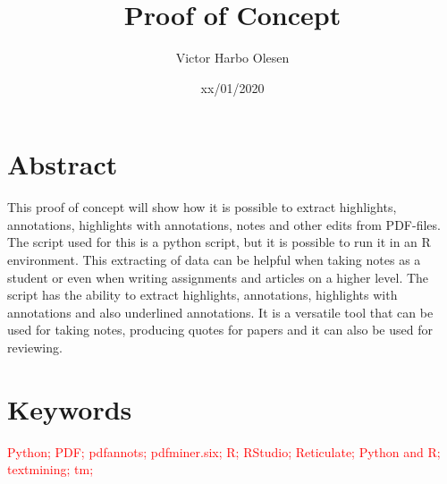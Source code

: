 \documentclass{article}
\title{Proof of Concept}
\author{Victor Harbo Olesen}
\date{xx/01/2020}
\begin{document}
\maketitle

\section{Abstract}
This proof of concept will show how it is possible to extract highlights, annotations, highlights with annotations, notes and other edits from PDF-files. The script used for this is a python script, but it is possible to run it in an R environment. This extracting of data can be helpful when taking notes as a student or even when writing assignments and articles on a higher level. The script has the ability to extract highlights, annotations, highlights with annotations and also underlined annotations. It is a versatile tool that can be used for taking notes, producing quotes for papers and it can also be used for reviewing.
\section{Keywords}
\textcolor{red}{Python; PDF; pdfannots; pdfminer.six; R; RStudio; Reticulate; Python and R; textmining; tm;} 
\end{document}
